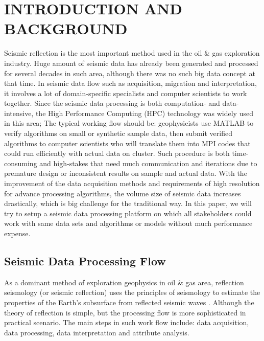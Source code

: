 %
%
%



\pagestyle{plain} %
\setcounter{page}{1}


\chapter{\uppercase {Introduction and Background}}

Seismic reflection is the most important method used in the oil \& gas exploration industry. Huge amount of seismic data has already been generated and processed for several decades in such area, although there was no such big data concept at that time. In seismic data flow such as acquisition, migration and interpretation, it involves a lot of domain-specific specialists and computer scientists to work together. Since the seismic data processing is both computation- and data-intensive, the High Performance Computing (HPC) technology was widely used in this area; The typical working flow should be: geophysicists use MATLAB to verify algorithms on small or synthetic sample data, then submit verified algorithms to computer scientists who will translate them into MPI codes that could run efficiently with actual data on cluster. Such procedure is both time-consuming and high-stakes that need much communication and iterations due to premature design or inconsistent results on sample and actual data. With the improvement of the data acquisition methods and requirements of high resolution for advance processing algorithms, the volume size of seismic data increases drastically, which is big challenge for the traditional way. In this paper, we will try to setup a seismic data processing platform on which all stakeholders could work with same data sets and algorithms or models without much performance expense.

\section{Seismic Data Processing Flow}
As a dominant method of exploration geophysics in oil \& gas area, reflection seismology (or seismic reflection) uses the principles of seismology to estimate the properties of the Earth's subsurface from reflected seismic waves \cite{seisreflectionwiki}. Although the theory of reflection is simple, but the processing flow is more sophisticated in practical scenario. The main steps in such work flow include: data acquisition, data processing, data interpretation and attribute analysis.

